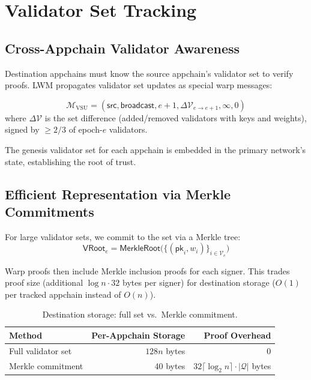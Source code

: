 \section{Validator Set Tracking}
\label{sec:tracking}

\subsection{Cross-Appchain Validator Awareness}

Destination appchains must know the source appchain's validator set to verify proofs. LWM propagates validator set updates as special warp messages:

\begin{definition}
\begin{equation}
    \mathcal{M}_{\text{VSU}} = (\mathsf{src}, \mathsf{broadcast}, e{+}1, \Delta\mathcal{V}_{e \to e+1}, \infty, 0)
\end{equation}
where $\Delta\mathcal{V}$ is the set difference (added/removed validators with keys and weights), signed by $\geq 2/3$ of epoch-$e$ validators.
\end{definition}

The genesis validator set for each appchain is embedded in the primary network's state, establishing the root of trust.

\subsection{Efficient Representation via Merkle Commitments}

For large validator sets, we commit to the set via a Merkle tree:
\begin{equation}
    \mathsf{VRoot}_e = \mathsf{MerkleRoot}\bigl(\{(\mathsf{pk}_i, w_i)\}_{i \in \mathcal{V}_e}\bigr)
\end{equation}

Warp proofs then include Merkle inclusion proofs for each signer. This trades proof size (additional $\log n \cdot 32$ bytes per signer) for destination storage ($O(1)$ per tracked appchain instead of $O(n)$).

\begin{table}[H]
\centering
\caption{Destination storage: full set vs.\ Merkle commitment.}
\label{tab:storage}
\begin{tabular}{lrr}
\toprule
\textbf{Method} & \textbf{Per-Appchain Storage} & \textbf{Proof Overhead} \\
\midrule
Full validator set & $128n$ bytes & 0 \\
Merkle commitment & 40 bytes & $32 \lceil\log_2 n\rceil \cdot |\mathcal{Q}|$ bytes \\
\bottomrule
\end{tabular}
\end{table}

